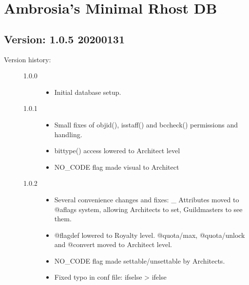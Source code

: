 \documentclass[letterpaper,10pt,english]{sphinxmanual}
\begin{document}
\section{Ambrosia’s Minimal Rhost DB}
\label{\detokenize{gettingstarted:ambrosia-s-minimal-rhost-db}}

\subsection{Version: 1.0.5          2020\sphinxhyphen{}01\sphinxhyphen{}31}
\label{\detokenize{gettingstarted:version-1-0-5-2020-01-31}}\begin{description}
\item[{Version history:}] \leavevmode\begin{description}
\item[{1.0.0}] \leavevmode\begin{itemize}
\item {} 
\sphinxAtStartPar
Initial database setup.

\end{itemize}

\item[{1.0.1}] \leavevmode\begin{itemize}
\item {} 
\sphinxAtStartPar
Small fixes of objid(), isstaff() and bccheck() permissions and handling.

\item {} 
\sphinxAtStartPar
bittype() access lowered to Architect level

\item {} 
\sphinxAtStartPar
NO\_CODE flag made visual to Architect

\end{itemize}

\item[{1.0.2}] \leavevmode\begin{itemize}
\item {} 
\sphinxAtStartPar
Several convenience changes and fixes: \_ Attributes moved to @aflags
system, allowing Architects to set, Guildmasters to see them.

\item {} 
\sphinxAtStartPar
@flagdef lowered to Royalty level. @quota/max, @quota/unlock and @convert
moved to Architect level.

\item {} 
\sphinxAtStartPar
NO\_CODE flag made settable/unsettable by Architects.

\item {} 
\sphinxAtStartPar
Fixed typo in conf file: ifselse \sphinxhyphen{}\textgreater{} ifelse


\end{itemize}
\end{description}
\end{description}
\end{document}
